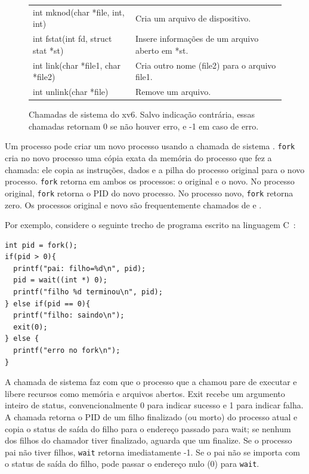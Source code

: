 \begin{figure}[t]
\begin{tabular}{ll}
int mknod(char *file, int, int)        & Cria um arquivo de dispositivo.                                                                                                              \\
int fstat(int fd, struct stat *st)     & Insere informações de um arquivo aberto em *st.                                                                                              \\
int link(char *file1, char *file2)     & Cria outro nome (file2) para o arquivo file1.                                                                                                \\
int unlink(char *file)                 & Remove um arquivo.                                                                                                                          
\end{tabular}
\caption{Chamadas de sistema do xv6. Salvo indicação contrária, essas chamadas retornam 0 se não houver erro, e -1 em caso de erro.}
\label{fig:api}
\end{figure}

Um processo pode criar um novo processo usando a chamada de sistema
.
\lstinline{fork}
cria no novo processo uma cópia exata da memória do processo que fez a chamada: ele copia as instruções, dados e
a pilha do processo original para o novo processo.
\lstinline{fork}
retorna em ambos os processos: o original e o novo.
No processo original, \lstinline{fork} retorna o PID do novo processo.
No processo novo, \lstinline{fork} retorna zero.
Os processos original e novo são frequentemente chamados de
e
.

Por exemplo, considere o seguinte trecho de programa escrito na linguagem C~\cite{kernighan}:
\begin{lstlisting}[]
int pid = fork();
if(pid > 0){
  printf("pai: filho=%d\n", pid);
  pid = wait((int *) 0);
  printf("filho %d terminou\n", pid);
} else if(pid == 0){
  printf("filho: saindo\n");
  exit(0);
} else {
  printf("erro no fork\n");
}
\end{lstlisting}
A chamada de sistema
faz com que o processo que a chamou pare de executar e
libere recursos como memória e arquivos abertos.
Exit recebe um argumento inteiro de status,
convencionalmente 0 para indicar sucesso e 1 para indicar falha.
A chamada
retorna o PID de um filho finalizado (ou morto) do processo atual
e copia o status de saída do filho para o endereço passado para wait;
se nenhum dos filhos do chamador tiver finalizado,
aguarda que um finalize.
Se o processo pai não tiver filhos, \lstinline{wait} retorna imediatamente -1.
Se o pai não se importa com o status de saída do filho, pode
passar o endereço nulo (0) para
\lstinline{wait}.

